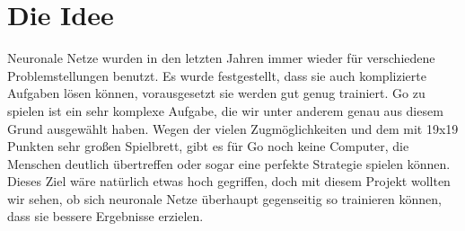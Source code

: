 \section{Die Idee}
Neuronale Netze wurden in den letzten Jahren immer wieder für verschiedene
Problemstellungen benutzt. Es wurde festgestellt, dass sie auch komplizierte
Aufgaben lösen können, vorausgesetzt sie werden gut genug trainiert. Go zu
spielen ist ein sehr komplexe Aufgabe, die wir unter anderem genau aus diesem
Grund ausgewählt haben. Wegen der vielen Zugmöglichkeiten und dem mit 19x19
Punkten sehr großen Spielbrett, gibt es für Go noch keine Computer, die
Menschen deutlich übertreffen oder sogar eine perfekte Strategie spielen
können. Dieses Ziel wäre natürlich etwas hoch gegriffen, doch mit diesem
Projekt wollten wir sehen, ob sich neuronale Netze überhaupt gegenseitig so
trainieren können, dass sie bessere Ergebnisse erzielen.